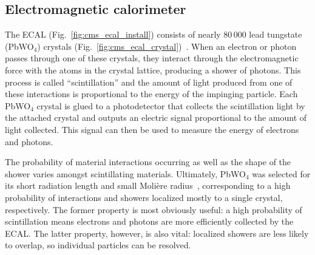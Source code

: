\subsection{Electromagnetic calorimeter}
The ECAL (Fig.~\ref{fig:cms_ecal_install}) consists of nearly 80\,000 lead tungstate (PbWO$_4$) crystals\footnotemark{} (Fig.~\ref{fig:cms_ecal_crystal})~\cite{CMSWebECAL}. 
When an electron or photon passes through one of these crystals, they interact through the electromagnetic force with the atoms in the crystal lattice, producing a shower of photons. 
This process is called ``scintillation'' and the amount of light produced from one of these interactions is proportional to the energy of the impinging particle. 
Each PbWO$_4$ crystal is glued to a photodetector that collects the scintillation light by the attached crystal and outputs an electric signal proportional to the amount of light collected. 
This signal can then be used to measure the energy of electrons and photons. 

The probability of material interactions occurring as well as the shape of the shower varies amongst scintillating materials. 
Ultimately, PbWO$_4$ was selected for its short radiation length and small Moli\`ere radius~\cite{CERN-LHCC-97-033}, corresponding to a high probability of interactions and showers localized mostly to a single crystal, respectively. 
The former property is most obviously useful: a high probability of scintillation means electrons and photons are more efficiently collected by the ECAL. 
The latter property, however, is also vital: localized showers are less likely to overlap, so individual particles can be resolved. 

